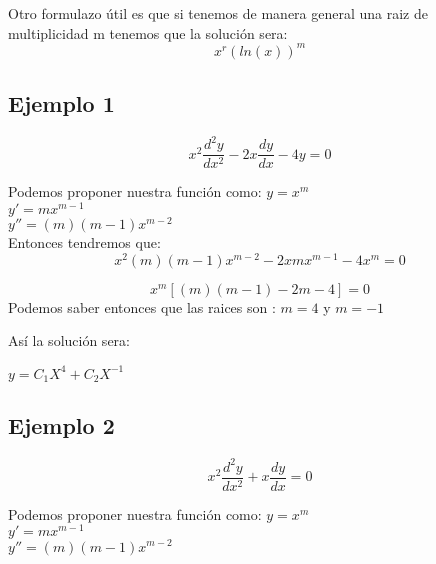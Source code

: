 \documentclass[12pt]{report}                               %
\begin{document}
        Otro formulazo útil es que si tenemos de manera general una raiz de multiplicidad m tenemos que la solución sera:
        \begin{equation}
            x^r (ln(x))^m
        \end{equation}


        \subsection{Ejemplo 1}
        \begin{equation*}
            x^2 \frac{d^2 y}{dx^2} - 2x \frac{dy}{dx} - 4y = 0
        \end{equation*}

        Podemos proponer nuestra función como:
        $y = x^m$\\
        $y' = mx^{m-1}$\\
        $y'' = (m)(m-1)x^{m-2}$\\

        Entonces tendremos que:
        \begin{equation*}
            x^2 (m)(m-1)x^{m-2} - 2x mx^{m-1} - 4x^m = 0
        \end{equation*}

        \begin{equation*}
            x^m [(m)(m-1)-  2m -4] = 0
        \end{equation*}
        Podemos saber entonces que las raices son : $ m = 4$ y $m = -1$

        Así la solución sera:

        $y = C_1X^4 + C_2 X^{-1}$

        \subsection{Ejemplo 2}
        \begin{equation*}
            x^2 \frac{d^2 y}{dx^2} + x \frac{dy}{dx} = 0
        \end{equation*}

        Podemos proponer nuestra función como:
        $y = x^m$\\
        $y' = mx^{m-1}$\\
        $y'' = (m)(m-1)x^{m-2}$\\
\end{document}
